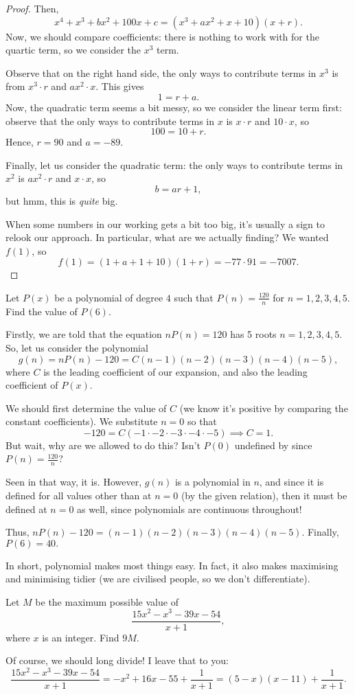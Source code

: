 \documentclass[../jarvis.tex]{subfiles}
\begin{document}
\begin{proof}
    Then, $$x^4+x^3+bx^2+100x+c=(x^3+ax^2+x+10)(x+r).$$
    Now, we should compare coefficients: there is nothing to work with for the quartic term, so we consider the $x^3$ term.
    
    Observe that on the right hand side, the only ways to contribute terms in $x^3$ is from $x^3\cdot r$ and $ax^2\cdot x$. This gives 
    $$1=r+a.$$
    Now, the quadratic term seems a bit messy, so we consider the linear term first: observe that the only ways to contribute terms in $x$ is $x\cdot r$ and $10\cdot x$, so
    $$100=10+r.$$
    Hence, $r=90$ and $a=-89$. 
    
    Finally, let us consider the quadratic term: the only ways to contribute terms in $x^2$ is $ax^2\cdot r$ and $x\cdot x$, so
    $$b=ar+1,$$
    but hmm, this is \textit{quite} big.
    
    When some numbers in our working gets a bit too big, it's usually a sign to relook our approach. In particular, what are we actually finding? We wanted $f(1)$,
    so $$f(1)=(1+a+1+10)(1+r)=-77\cdot 91=\boxed{-7007}.$$
\end{proof}

\begin{example}[2018 SMO(O) P16]
    Let $P(x)$ be a polynomial of degree $4$ such that $P(n)=\frac{120}{n}$ for $n=1,2,3,4,5$. Find the value of $P(6)$.
\end{example}
Firstly, we are told that the equation $nP(n)=120$ has 5 roots $n=1,2,3,4,5$. So, let us consider the polynomial
$$g(n)=nP(n)-120=C(n-1)(n-2)(n-3)(n-4)(n-5),$$
where $C$ is the leading coefficient of our expansion, and also the leading coefficient of $P(x)$.

We should first determine the value of $C$ (we know it's positive by comparing the constant coefficients). We substitute $n=0$ so that $$-120=C\left(-1\cdot-2\cdot-3\cdot-4\cdot-5\right) \implies C=1.$$
But wait, why are we allowed to do this? Isn't $P(0)$ undefined by since $P(n)=\frac{120}{n}$?

Seen in that way, it is. However, $g(n)$ is a polynomial in $n$, and since it is defined for all values other than at $n=0$ (by the given relation), then it must be defined at $n=0$ as well, since polynomials are continuous throughout!

Thus, $nP(n)-120=(n-1)(n-2)(n-3)(n-4)(n-5)$. Finally, $P(6)=\boxed{40}.$

In short, polynomial makes most things easy. In fact, it also makes maximising and minimising tidier (we are civilised people, so we don't differentiate).
\begin{example}[2019 SMO(S) P16]
    Let $M$ be the maximum possible value of $$\frac{15x^2-x^3-39x-54}{x+1},$$ where $x$ is an integer. Find $9M$.
\end{example}
Of course, we should long divide! I leave that to you:
$$\frac{15x^2-x^3-39x-54}{x+1}=-x^2+16x-55+\frac{1}{x+1}=(5-x)(x-11)+\frac{1}{x+1}.$$
\end{document}

